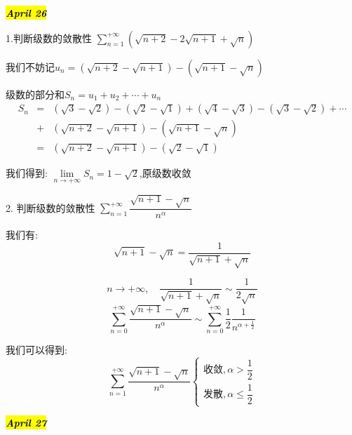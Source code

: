 \hl{\textbf{\textit{April 26}}}

1.判断级数的敛散性 $\sum\limits_{n=1}^{+\infty}(\sqrt{n+2}-2\sqrt{n+1}+\sqrt{n})$
\begin{solution}
	
	我们不妨记$u_{n}=(\sqrt{n+2}-\sqrt{n+1})-(\sqrt{n+1}-\sqrt{n})$
	
	级数的部分和$S_{n}=u_{1}+u_{2}+\cdots+u_{n}$
	\begin{eqnarray*}
		S_{n}&=&(\sqrt{3}-\sqrt{2})-(\sqrt{2}-\sqrt{1})+(\sqrt{4}-\sqrt{3})-(\sqrt{3}-\sqrt{2})+\cdots\\
		&+&(\sqrt{n+2}-\sqrt{n+1})-(\sqrt{n+1}-\sqrt{n})\\
		&=&(\sqrt{n+2}-\sqrt{n+1})-(\sqrt{2}-\sqrt{1})
	\end{eqnarray*}
	
	我们得到: $\lim\limits_{n\rightarrow +\infty}S_{n}=1-\sqrt{2}$,原级数收敛
\end{solution}

2. 判断级数的敛散性 $\sum\limits_{n=1}^{+\infty}\dfrac{\sqrt{n+1}-\sqrt{n}}{n^{\alpha}}$
\begin{solution}
	我们有: 
	$$\sqrt{n+1}-\sqrt{n}=\dfrac{1}{\sqrt{n+1}+\sqrt{n}}$$
	
	$$n\rightarrow  +\infty,\quad \frac{1}{\sqrt{n+1}+\sqrt{n}}\sim\frac{1}{2\sqrt{n}}$$
	$$\sum\limits_{n=0}^{+\infty}\frac{\sqrt{n+1}-\sqrt{n}}{n^{\alpha}}\sim\sum\limits_{n=0}^{+\infty}\frac{1}{2}\frac{1}{n^{\alpha+\frac{1}{2}}}$$
	
	我们可以得到: 
	$$\sum\limits_{n=1}^{+\infty}\frac{\sqrt{n+1}-\sqrt{n}}{n^{\alpha}}\left\lbrace 
	\begin{array}{l}
		\text{收敛},\alpha>\dfrac{1}{2}\\
		\text{发散},\alpha \leq \dfrac{1}{2}
	\end{array}
	\right. $$
\end{solution}

\hl{\textbf{\textit{April 27}}}


